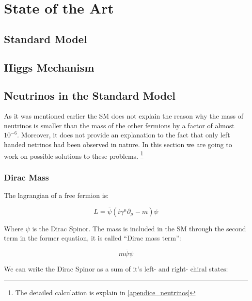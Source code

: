 \chapter{State of the Art} 

\section{Standard Model}

\section{Higgs Mechanism}

\section{Neutrinos in the Standard Model}

As it was mentioned earlier the SM does not explain the reason why the mass of neutrinos is smaller than the mass of the other fermions by a factor of almost $10^{-6}$. Moreover, it does not
provide an explanation to the fact that only left handed netrinos had been observed in nature. 
In this section we are going to work on possible solutions to these problems. \footnote{The detailed calculation is explain in \ref{apendice_neutrinos}}

\subsection{Dirac Mass}
The lagrangian of a free fermion is:

\begin{equation}
 L = \overline{\psi} \left( i \gamma ^\mu \partial_{\mu} - m \right) \psi
\end{equation}

Where $\psi$ is the Dirac Spinor. The mass is included in the SM through the second term in the former equation, it is called ``Dirac mass term'':

\begin{equation}
 m \overline{\psi} \psi
\end{equation}

We can write the Dirac Spinor as a sum of it's left- and right- chiral states:

